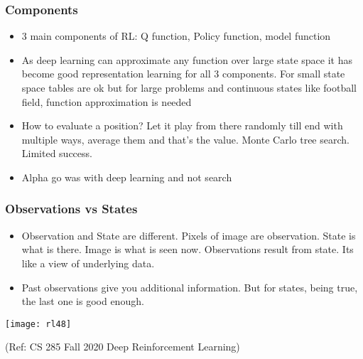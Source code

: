 \begin{frame}[fragile]\frametitle{Components}


\begin{itemize}
\item 3 main components of RL: Q function, Policy function, model function
\item As deep learning can approximate any function over large state space it has become good representation learning for all 3 components. For small state space tables are ok but for large problems and continuous states like football field, function approximation is needed
\item How to evaluate a position? Let it play from there randomly till end with multiple ways, average them and that's the value. Monte Carlo tree search. Limited success.
\item Alpha go was with deep learning and not search

\end{itemize}

\end{frame}

\begin{frame}[fragile]\frametitle{Observations vs States}

\begin{itemize}
\item Observation and State are different. Pixels of image are observation. State is what is there. Image is what is seen now. Observations result from state. Its like a view of underlying data.
\item Past observations give you additional information. But for states, being true, the last one is good enough.
\end{itemize}


\begin{center}
\texttt{[image: rl48]}
\end{center}


{\tiny (Ref: CS 285 Fall 2020 Deep Reinforcement Learning)}

\end{frame}

